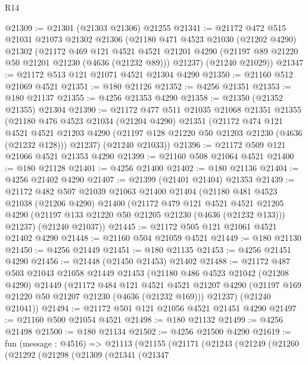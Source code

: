 \begin{lexlean}{R14}
\begin{coremodule}
@21309 := @21301 (@21303 @21306) @21255
@21341 := @21172
    @472
    @515
    @21031
    @21073
    @21302
    @21306
    (@21180
      @471
      @4523
      @21030
      (@21202 @4290)
      @21302
      (@21172
        @469
        @121
        @4521
        @4521
        @21201
        @4290
        (@21197 @89 @21220 @50 @21201 @21230 (@4636 (@21232 @89)))
        @21237)
      (@21240 @21029))
@21347 := @21172 @513 @121 @21071 @4521 @21304 @4290
@21350 := @21160 @512 @21069 @4521
@21351 := @180 @21126
@21352 := @4256 @21351
@21353 := @180 @21137
@21355 := @4256 @21353 @4290
@21358 := @21350 (@21352 @21355) @21304
@21390 := @21172
    @477
    @511
    @21035
    @21068
    @21351
    @21355
    (@21180
      @476
      @4523
      @21034
      (@21204 @4290)
      @21351
      (@21172
        @474
        @121
        @4521
        @4521
        @21203
        @4290
        (@21197 @128 @21220 @50 @21203 @21230 (@4636 (@21232 @128)))
        @21237)
      (@21240 @21033))
@21396 := @21172 @509 @121 @21066 @4521 @21353 @4290
@21399 := @21160 @508 @21064 @4521
@21400 := @180 @21128
@21401 := @4256 @21400
@21402 := @180 @21136
@21404 := @4256 @21402 @4290
@21407 := @21399 (@21401 @21404) @21353
@21439 := @21172
    @482
    @507
    @21039
    @21063
    @21400
    @21404
    (@21180
      @481
      @4523
      @21038
      (@21206 @4290)
      @21400
      (@21172
        @479
        @121
        @4521
        @4521
        @21205
        @4290
        (@21197 @133 @21220 @50 @21205 @21230 (@4636 (@21232 @133)))
        @21237)
      (@21240 @21037))
@21445 := @21172 @505 @121 @21061 @4521 @21402 @4290
@21448 := @21160 @504 @21059 @4521
@21449 := @180 @21130
@21450 := @4256 @21449
@21451 := @180 @21135
@21453 := @4256 @21451 @4290
@21456 := @21448 (@21450 @21453) @21402
@21488 := @21172
    @487
    @503
    @21043
    @21058
    @21449
    @21453
    (@21180
      @486
      @4523
      @21042
      (@21208 @4290)
      @21449
      (@21172
        @484
        @121
        @4521
        @4521
        @21207
        @4290
        (@21197 @169 @21220 @50 @21207 @21230 (@4636 (@21232 @169)))
        @21237)
      (@21240 @21041))
@21494 := @21172 @501 @121 @21056 @4521 @21451 @4290
@21497 := @21160 @500 @21054 @4521
@21498 := @180 @21132
@21499 := @4256 @21498
@21500 := @180 @21134
@21502 := @4256 @21500 @4290
@21619 := fun (message : @4516) =>
  @21113
    (@21155
      (@21171
        (@21243
          (@21249
            (@21260
              (@21292
                (@21298
                  (@21309
                    (@21341
                      (@21347

\end{coremodule}
\end{lexlean}
